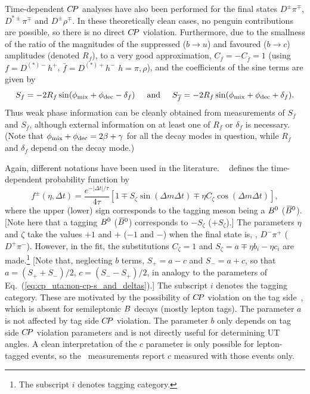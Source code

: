 Time-dependent $C\!P$ analyses have also been performed for the
final states $D^{\pm}\pi^{\mp}$, $D^{*\pm}\pi^{\mp}$ and $D^{\pm}\rho^{\mp}$.
In these theoretically clean cases, no penguin contributions are possible,
so there is no direct $C\!P$ violation.
Furthermore, due to the smallness of the ratio of the magnitudes of the 
suppressed ($b \to u$) and favoured ($b \to c$) amplitudes (denoted $R_f$),
to a very good approximation, $C_f = - C_{\bar{f}} = 1$
(using $f = D^{(*)-}h^+$, $\bar{f} = D^{(*)+}h^-$ $h = \pi,\rho$),
and the coefficients of the sine terms are given by
\begin{equation}
  S_f = - 2 R_f \sin( \phi_{\rm mix} + \phi_{\rm dec} - \delta_f )
  \hspace{5mm}
  {\rm and}
  \hspace{5mm}
  S_{\bar{f}} = - 2 R_f \sin( \phi_{\rm mix} + \phi_{\rm dec} + \delta_f ).
\end{equation}
Thus weak phase information can be cleanly obtained from measurements
of $S_f$ and $S_{\bar{f}}$, 
although external information on at least one of $R_f$ or $\delta_f$ is necessary.
(Note that $\phi_{\rm mix} + \phi_{\rm dec} = 2\beta + \gamma$ for all the decay modes 
in question, while $R_f$ and $\delta_f$ depend on the decay mode.)

Again, different notations have been used in the literature.
\babar~\cite{Aubert:2006tw,Aubert:2005yf}
defines the time-dependent probability function by
\begin{equation}
  f^\pm (\eta, \Delta t) = \frac{e^{-|\Delta t|/\tau}}{4\tau} 
  \left[  
    1 \mp S_\zeta \sin (\Delta m \Delta t) \mp \eta C_\zeta \cos(\Delta m \Delta t) 
  \right],
\end{equation} 
where the upper (lower) sign corresponds to 
the tagging meson being a $B^0$ ($\kern 0.18em\overline{\kern -0.18em B}{}^0$). 
[Note here that a tagging $B^0$ ($\kern 0.18em\overline{\kern -0.18em B}{}^0$) corresponds to $-S_\zeta$ ($+S_\zeta$).]
The parameters $\eta$ and $\zeta$ take the values $+1$ and $+$ ($-1$ and $-$) 
when the final state is, \eg, $D^-\pi^+$ ($D^+\pi^-$). 
However, in the fit, the substitutions $C_\zeta = 1$ and 
$S_\zeta = a \mp \eta b_i - \eta c_i$ are made.\footnote{
  The subscript $i$ denotes tagging category.
}
[Note that, neglecting $b$ terms, $S_+ = a - c$ and $S_- = a + c$, 
so that $a = (S_+ + S_-)/2$, $c = (S_- - S_+)/2$, in analogy to 
the parameters of Eq.~(\ref{eq:cp_uta:non-cp-s_and_deltas}).] 
The subscript $i$ denotes the tagging category. 
These are motivated by the possibility of 
$C\!P$ violation on the tag side~\cite{Long:2003wq}, 
which is absent for semileptonic $B$ decays (mostly lepton tags). 
The parameter $a$ is not affected by tag side $C\!P$ violation. 
The parameter $b$ only depends on tag side $C\!P$ violation parameters 
and is not directly useful for determining UT angles.
A clean interpretation of the $c$ parameter is only possible for 
lepton-tagged events,
so the \babar\ measurements report $c$ measured with those events only.

